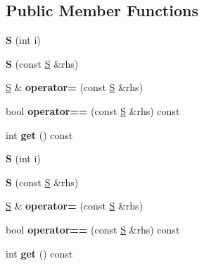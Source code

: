 \subsection*{Public Member Functions}
\begin{DoxyCompactItemize}
\item 
\mbox{\label{struct_s_a0c875e1e53cfaedc348de21afc4f78c2}} 
{\bfseries S} (int i)
\item 
\mbox{\label{struct_s_a994f7bb3c1c2b625fd60acb3daad7f58}} 
{\bfseries S} (const \mbox{\hyperlink{struct_s}{S}} \&rhs)
\item 
\mbox{\label{struct_s_aec869db7ce4f7b19c8ae881e8d07da5b}} 
\mbox{\hyperlink{struct_s}{S}} \& {\bfseries operator=} (const \mbox{\hyperlink{struct_s}{S}} \&rhs)
\item 
\mbox{\label{struct_s_a1ed998c196b6e73e77d78594a90f893b}} 
bool {\bfseries operator==} (const \mbox{\hyperlink{struct_s}{S}} \&rhs) const
\item 
\mbox{\label{struct_s_aad88de77e943debf4adc0a1223ed82d3}} 
int {\bfseries get} () const
\item 
\mbox{\label{struct_s_a0c875e1e53cfaedc348de21afc4f78c2}} 
{\bfseries S} (int i)
\item 
\mbox{\label{struct_s_a994f7bb3c1c2b625fd60acb3daad7f58}} 
{\bfseries S} (const \mbox{\hyperlink{struct_s}{S}} \&rhs)
\item 
\mbox{\label{struct_s_aec869db7ce4f7b19c8ae881e8d07da5b}} 
\mbox{\hyperlink{struct_s}{S}} \& {\bfseries operator=} (const \mbox{\hyperlink{struct_s}{S}} \&rhs)
\item 
\mbox{\label{struct_s_a1ed998c196b6e73e77d78594a90f893b}} 
bool {\bfseries operator==} (const \mbox{\hyperlink{struct_s}{S}} \&rhs) const
\item 
\mbox{\label{struct_s_aad88de77e943debf4adc0a1223ed82d3}} 
int {\bfseries get} () const
\item 
\mbox{\label{struct_s_afea5f23141ca0753f2b8e9ac8bc13ba0}} 

\end{DoxyCompactItemize}
